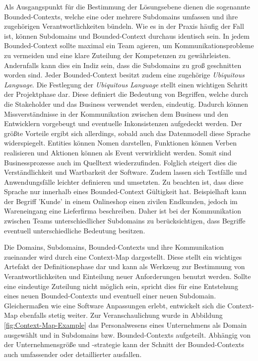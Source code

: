 Als Ausgangspunkt für die Bestimmung der Lösungsebene dienen die sogenannte Bounded-Contexts, welche eine oder mehrere Subdomains umfassen und ihre zugehörigen Verantwortlichkeiten bündeln. Wie es in der Praxis häufig der Fall ist, können Subdomains und Bounded-Context durchaus identisch sein. In jedem Bounded-Context sollte maximal ein Team agieren, um Kommunikationsprobleme zu vermeiden und eine klare Zuteilung der Kompetenzen zu gewährleisten. Andernfalls kann dies ein Indiz sein, dass die Subdomains zu groß geschnitten worden sind. Jeder Bounded-Context besitzt zudem eine zugehörige \emph{Ubiquitous Language}. Die Festlegung der \emph{Ubiquitous Language} stellt einen wichtigen Schritt der Projektphase dar. Diese definiert die Bedeutung von Begriffen, welche durch die Stakeholder und das Business verwendet werden, eindeutig. Dadurch können Missverständnisse in der Kommunikation zwischen dem Business und den Entwicklern vorgebeugt und eventuelle Inkonsistenzen aufgedeckt werden. Der größte Vorteile ergibt sich allerdings, sobald auch das Datenmodell diese Sprache widerspiegelt. Entities können Nomen darstellen, Funktionen können Verben realisieren und Aktionen können als Event verwirklicht werden. Somit sind Businessprozesse auch im Quelltext wiederzufinden. Folglich steigert dies die Verständlichkeit und Wartbarkeit der Software. Zudem lassen sich Testfälle und Anwendungsfälle leichter definieren und umsetzten. Zu beachten ist, dass diese Sprache nur innerhalb eines Bounded-Context Gültigkeit hat. Beispielhaft kann der Begriff 'Kunde' in einem Onlineshop einen zivilen Endkunden, jedoch im Wareneingang eine Lieferfirma beschreiben. Daher ist bei der Kommunikation zwischen Teams unterschiedlicher Subdomains zu berücksichtigen, dass Begriffe eventuell unterschiedliche Bedeutung besitzen. 

Die  Domains, Subdomains, Bounded-Contexts und ihre Kommunikation zueinander wird durch eine Context-Map dargestellt. Diese stellt ein wichtiges Artefakt der Definitionsphase dar und kann als Werkzeug zur Bestimmung von Verantwortlichkeiten und Einteilung neuer Anforderungen benutzt werden. Sollte eine eindeutige Zuteilung nicht möglich sein, spricht dies für eine Entstehung eines neuen Bounded-Contexts und eventuell einer neuen Subdomain. Gleichermaßen wie eine Software Anpassungen erlebt, entwickelt sich die Context-Map ebenfalls stetig weiter. Zur Veranschaulichung wurde in Abbildung \ref{fig:Context-Map-Example} das Personalwesens eines Unternehmens als Domain ausgewählt und in Subdomains bzw. Bounded-Contexts aufgeteilt. Abhängig von der Unternehmensgröße und -strategie kann der Schnitt der Bounded-Contexts auch umfassender oder detaillierter ausfallen.

